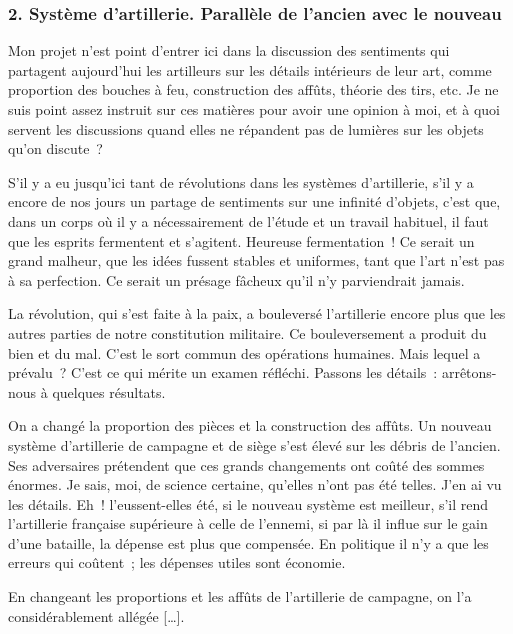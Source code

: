 \documentclass[french,twoside]{book} %
\begin{document}
\subsubsection[{2. Système d’artillerie. Parallèle de l’ancien avec le nouveau}]{2. Système d’artillerie. Parallèle de l’ancien avec le nouveau}
\noindent Mon projet n’est point d’entrer ici dans la discussion des sentiments qui partagent aujourd’hui les artilleurs sur les détails intérieurs de leur art, comme proportion des bouches à feu, construction des affûts, théorie des tirs, etc. Je ne suis point assez instruit sur ces matières pour avoir une opinion à moi, et à quoi servent les discussions quand elles ne répandent pas de lumières sur les objets qu’on discute ?\par
S’il y a eu jusqu’ici tant de révolutions dans les systèmes d’artillerie, s’il y a encore de nos jours un partage de sentiments sur une infinité d’objets, c’est que, dans un corps où il y a nécessairement de l’étude et un travail habituel, il faut que les esprits fermentent et s’agitent. Heureuse fermentation ! Ce serait un grand malheur, que les idées fussent stables et uniformes, tant que l’art n’est pas à sa perfection. Ce serait un présage fâcheux qu’il n’y parviendrait jamais.\par
La révolution, qui s’est faite à la paix, a bouleversé l’artillerie encore plus que les autres parties de notre constitution militaire. Ce bouleversement a produit du bien et du mal. C’est le sort commun des opérations humaines. Mais lequel a prévalu ? C’est ce qui mérite un examen réfléchi. Passons les détails : arrêtons-nous à quelques résultats.\par
On a changé la proportion des pièces et la construction des affûts. Un nouveau système d’artillerie de campagne et de siège s’est élevé sur les débris de l’ancien. Ses adversaires prétendent que ces grands changements ont coûté des sommes énormes. Je sais, moi, de science certaine, qu’elles n’ont pas été telles. J’en ai vu les détails. Eh ! l’eussent-elles été, si le nouveau système est meilleur, s’il rend l’artillerie française supérieure à celle de l’ennemi, si par là il influe sur le gain d’une bataille, la dépense est plus que compensée. En politique il n’y a que les erreurs qui coûtent ; les dépenses utiles sont économie.\par
En changeant les proportions et les affûts de l’artillerie de campagne, on l’a considérablement allégée […].\par
\end{document}
